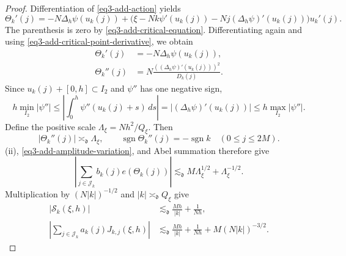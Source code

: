\documentclass[reqno,12pt]{amsart}
\numberwithin{equation}{section}
\begin{document}
\begin{proof}
Differentiation of \eqref{eq3-add-action} yields
\[
 \Theta_k'(j)=-N\Delta_h\psi(u_k(j))
 +\bigl(\xi-Nk\psi'(u_k(j))-Nj(\Delta_h\psi)'(u_k(j))\bigr)u_k'(j).
\]
The parenthesis is zero by \eqref{eq3-add-critical-equation}.
Differentiating again and using
\eqref{eq3-add-critical-point-derivative}, we obtain
\begin{align}
 \Theta_k'(j)&=-N\Delta_h\psi(u_k(j)),
       \label{eq3-add-action-first}\\
 \Theta_k''(j)&=N\frac{((\Delta_h\psi)'(u_k(j)))^2}{D_k(j)}.
       \label{eq3-add-action-second}
\end{align}
Since $u_k(j)+[0,h]\subset I_2$ and $\psi''$ has one negative sign,
\[
 h\min_{I_2}|\psi''|
 \le\left|\int_0^h\psi''(u_k(j)+s)\,ds\right|
 =|(\Delta_h\psi)'(u_k(j))|
 \le h\max_{I_2}|\psi''|.
\]
Define the positive scale $\Lambda_\xi=Nh^2/Q_\xi$. Then
\begin{equation}
 |\Theta_k''(j)|\asymp_{\mathfrak d}\Lambda_\xi,
 \qquad \operatorname{sgn}\Theta_k''(j)=-\operatorname{sgn}k
                         \quad(0\le j\le2M).
 \label{eq3-add-mode-curvature}
\end{equation}
(ii), \eqref{eq3-add-amplitude-variation}, and Abel summation
therefore give
\[
 \left|\sum_{j\in\mathcal J_k}b_k(j)e(\Theta_k(j))\right|
 \lesssim_{\mathfrak d}M\Lambda_\xi^{1/2}+\Lambda_\xi^{-1/2}.
\]
Multiplication by $(N|k|)^{-1/2}$ and
$|k|\asymp_{\mathfrak d}Q_\xi$ give
\begin{equation}
 \begin{split}
 |\mathcal S_k(\xi,h)|&\lesssim_{\mathfrak d}
                    \frac{Mh}{|k|}+\frac1{Nh},\\
 \left|\sum_{j\in\mathcal J_k}a_k(j)J_{k,j}(\xi,h)\right|
 &\lesssim_{\mathfrak d}
       \frac{Mh}{|k|}+\frac1{Nh}+M(N|k|)^{-3/2}.
 \end{split}
 \label{eq3-add-mode-second-bound}
\end{equation}


\end{proof}
\end{document}
